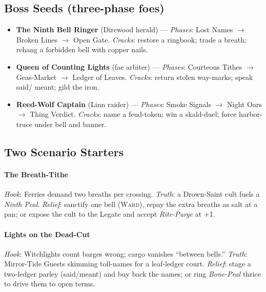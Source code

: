 \subsection*{Boss Seeds (three-phase foes)}
\begin{itemize}
  \item \textbf{The Ninth Bell Ringer} (Direwood herald) — \emph{Phases}: Lost Names $\rightarrow$ Broken Lines $\rightarrow$ Open Gate. \emph{Cracks}: restore a ringbook; trade a breath; rehang a forbidden bell with copper nails.
  \item \textbf{Queen of Counting Lights} (fae arbiter) — \emph{Phases}: Courteous Tithes $\rightarrow$ Geas-Market $\rightarrow$ Ledger of Leaves. \emph{Cracks}: return stolen way-marks; speak said/ meant; gild the iron.
  \item \textbf{Reed-Wolf Captain} (Linn raider) — \emph{Phases}: Smoke Signals $\rightarrow$ Night Oars $\rightarrow$ Thing Verdict. \emph{Cracks}: name a feud-token; win a skald-duel; force harbor-truce under bell and banner.
\end{itemize}

\subsection*{Two Scenario Starters}
\paragraph{The Breath-Tithe}
\emph{Hook}: Ferries demand two breaths per crossing. \emph{Truth}: a Drown-Saint cult fuels a \emph{Ninth Peal}. \emph{Relief}: sanctify one bell (\textsc{Ward}), repay the extra breaths as salt at a pan; or expose the cult to the Legate and accept \emph{Rite-Purge} at +1.

\paragraph{Lights on the Dead-Cut}
\emph{Hook}: Witchlights count barges wrong; cargo vanishes “between bells.” \emph{Truth}: Mirror-Tide Guests skimming toll-names for a leaf-ledger court. \emph{Relief}: stage a two-ledger parley (said/meant) and buy back the names; or ring \emph{Bone-Peal} thrice to drive them to open terms.

